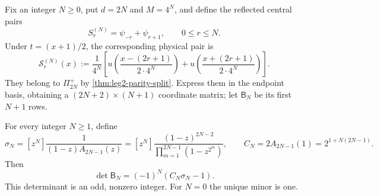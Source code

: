Fix an integer $N\ge0$, put $d=2N$ and $M=4^N$, and define the reflected central pairs
\begin{equation}
 S_r^{(N)}=\psi_{-r}+\psi_{r+1},
 \qquad 0\le r\le N.
 \label{eq:leg2-central-pairs}
\end{equation}
Under $t=(x+1)/2$, the corresponding physical pair is
\begin{equation}
 \boxed{\mathcal S_r^{(N)}(x):=\frac1{4^N}\left[
 u\!\left(\frac{x-(2r+1)}{2\cdot4^N}\right)
 +u\!\left(\frac{x+(2r+1)}{2\cdot4^N}\right)\right].}
 \label{eq:leg2-physical-central-pairs}
\end{equation}
They belong to $\Pi_{2N}^+$ by \cref{thm:leg2-parity-split}.  Express them in
the endpoint basis, obtaining a $(2N+2)\times(N+1)$ coordinate matrix; let
$\mathsf B_N$ be its first $N+1$ rows.

\begin{theorem}
\label{thm:leg2-central-determinant}
For every integer $N\ge1$, define
\begin{equation}
 \sigma_N=[z^N]\frac1{(1-z)A_{2N-1}(z)}
 =[z^N]\frac{(1-z)^{2N-2}}
 {\prod_{m=1}^{2N-1}(1-z^{2^m})},
 \qquad
 C_N=2A_{2N-1}(1)=2^{1+N(2N-1)}.
 \label{eq:leg2-sigma}
\end{equation}
Then
\begin{equation}
 \boxed{\det\mathsf B_N=(-1)^N(C_N\sigma_N-1).}
 \label{eq:leg2-central-determinant}
\end{equation}
This determinant is an odd, nonzero integer.  For $N=0$ the unique minor is
one.
\end{theorem}

